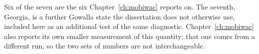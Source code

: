 Six of the seven are the six Chapter~\ref{ch:mobiwac} reports on. The seventh, Georgia, is a further
Gowalla state the dissertation does not otherwise use, included here as an additional test of the
same diagnostic. Chapter~\ref{ch:mobiwac} also reports its own smaller measurement of this
quantity; that one comes from a different run, so the two sets of numbers are not interchangeable.
